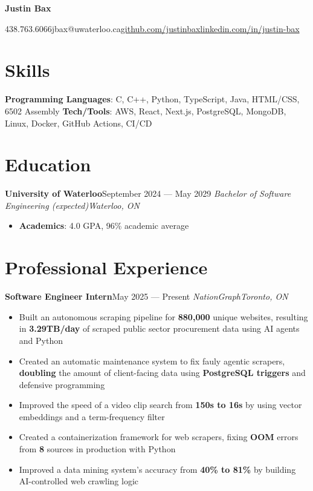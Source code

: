 \documentclass{article}
\newcommand{\cdelim}{\;\textbar\;}
\newcommand{\newrole}[4]{
    {\normalfont\textbf{#1}\hfill#3}
    \newline
    \textit{#2}\hfill\textit{#4}
}
\newenvironment{bulletpoints}{\begin{itemize}\setlength\itemsep{-0.2em}}{\end{itemize}}
\begin{document}
\begin{center}
    {\Huge\bfseries Justin Bax}\\\vspace*{2pt}

    438.763.6066\cdelim jbax@uwaterloo.ca\cdelim\href{https://github.com/justinbax}{github.com/justinbax}\cdelim\href{https://linkedin.com/in/justin-bax}{linkedin.com/in/justin-bax}\\
\end{center}

\section*{Skills}

{\bfseries Programming Languages}: C, C++, Python, TypeScript, Java, HTML/CSS, 6502 Assembly
\newline
{\bfseries Tech/Tools}: AWS, React, Next.js, PostgreSQL, MongoDB, Linux, Docker, GitHub Actions, CI/CD


\section*{Education}

\newrole{University of Waterloo}{Bachelor of Software Engineering (expected)}{September 2024 --- May 2029}{Waterloo, ON}
\begin{bulletpoints}
    \vspace*{-2pt}
    \item {\bfseries Academics}: 4.0 GPA, 96\% academic average
\end{bulletpoints}


\section*{Professional Experience}

\newrole{Software Engineer Intern}{NationGraph}{May 2025 --- Present}{Toronto, ON}
\begin{bulletpoints}
    \item Built an autonomous scraping pipeline for \textbf{880,000} unique websites, resulting in \textbf{3.29TB/day} of scraped public sector procurement data using AI agents and Python
    \item Created an automatic maintenance system to fix fauly agentic scrapers, \textbf{doubling} the amount of client-facing data using \textbf{PostgreSQL triggers} and defensive programming
    \item Improved the speed of a video clip search from \textbf{150s to 16s} by using vector embeddings and a term-frequency filter
    \item Created a containerization framework for web scrapers, fixing \textbf{OOM} errors from \textbf{8} sources in production with Python
    \item Improved a data mining system's accuracy from \textbf{40\% to 81\%} by building AI-controlled web crawling logic 
\end{bulletpoints}
\end{document}
